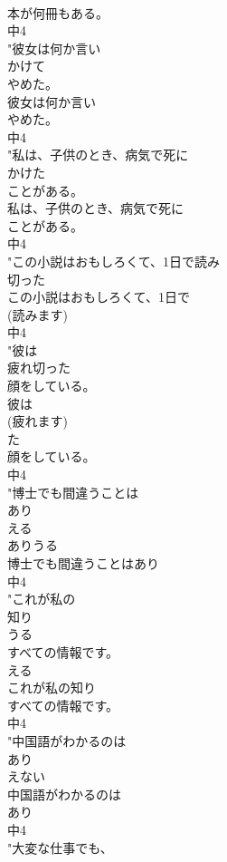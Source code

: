 \documentclass[8pt]{extreport}
\begin{document}
\begin{CJK}{UTF8}{min}
\\	本が何冊もある。
\\	中4
\\	"彼女は何か言い
\\	かけて
\\	やめた。
\\	彼女は何か言い
\\	やめた。
\\	中4
\\	"私は、子供のとき、病気で死に
\\	かけた
\\	ことがある。
\\	私は、子供のとき、病気で死に
\\	ことがある。
\\	中4
\\	"この小説はおもしろくて、1日で読み
\\	切った
\\	この小説はおもしろくて、1日で
\\	(読みます)
\\	中4
\\	"彼は
\\	疲れ切った
\\	顔をしている。
\\	彼は
\\	(疲れます)
\\	た
\\	顔をしている。
\\	中4
\\	"博士でも間違うことは
\\	あり
\\	える
\\	ありうる
\\	博士でも間違うことはあり
\\	中4
\\	"これが私の
\\	知り
\\	うる
\\	すべての情報です。
\\	える
\\	これが私の知り
\\	すべての情報です。
\\	中4
\\	"中国語がわかるのは
\\	あり
\\	えない
\\	中国語がわかるのは
\\	あり
\\	中4
\\	"大変な仕事でも、

\end{CJK}
\end{document}
